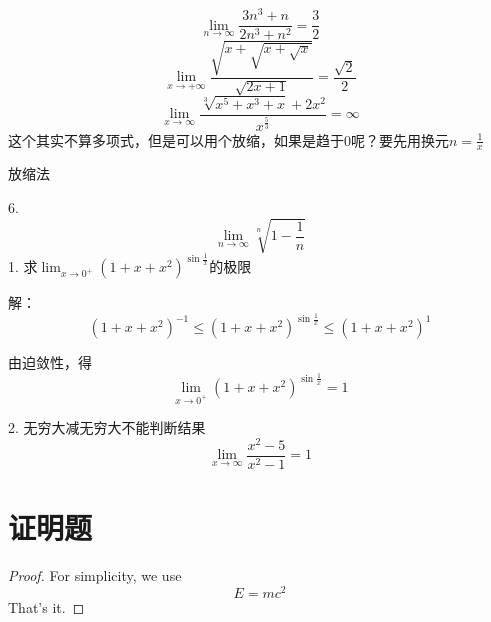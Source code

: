 \documentclass[12pt, a4paper]{ctexart}
\begin{document}
\begin{flushleft}
    \[\lim \limits _{n \rightarrow \infty} \frac{3n^3+n}{2n^3+n^2}=\frac{3}{2}\]
    \[\lim \limits _{x \rightarrow +\infty} \frac{\sqrt{x+\sqrt{x+\sqrt{x}}}}{\sqrt{2x+1}}=\frac{\sqrt{2}}{2}\]
    \[\lim \limits _{x \rightarrow \infty} \frac{\sqrt[3]{x^5+x^3+x}+2x^2}{x^{\frac{5}{3}}}=\infty\]
    这个其实不算多项式，但是可以用个放缩，如果是趋于0呢？要先用换元$n=\frac{1}{x}$

    放缩法

    6.\[\lim \limits _{n \rightarrow \infty} \sqrt[n]{1-\frac{1}{n}}\]
    1. 求$
    \lim _{x \rightarrow 0^{+}}\left(1+x+x^{2}\right)^{\sin \frac{1}{x}}
    $的极限

    解：
    \[
    \left(1+x+x^{2}\right)^{-1} \leqslant\left(1+x+x^{2}\right)^{\sin \frac{1}{x}} \leqslant\left(1+x+x^{2}\right)^{1}
    \]

    由迫敛性，得$$\lim _{x \rightarrow 0^{+}} (1+x+x^2)^{\sin \frac{1}{x}} = 1$$
    


    2. 无穷大减无穷大不能判断结果
    \[
    \lim _{x \rightarrow \infty} \frac{x^{2}-5}{x^{2}-1}=1
    \]
    \end{flushleft}

\section{证明题}
    \begin{proof} %
    For simplicity, we use
    \[
    E=mc^2
    \]
    That's it.
    \end{proof}
\end{document}
